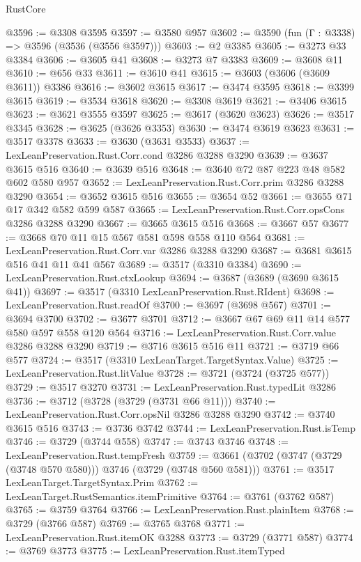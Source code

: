 \begin{lexlean}{RustCore}
\begin{coremodule}
@3596 := @3308 @3595
@3597 := @3580 @957
@3602 := @3590 (fun (Γ : @3338) => @3596 (@3536 (@3556 @3597)))
@3603 := @2 @3385
@3605 := @3273 @33 @3384
@3606 := @3605 @41
@3608 := @3273 @7 @3383
@3609 := @3608 @11
@3610 := @656 @33
@3611 := @3610 @41
@3615 := @3603 (@3606 (@3609 @3611)) @3386
@3616 := @3602 @3615
@3617 := @3474 @3595
@3618 := @3399 @3615
@3619 := @3534 @3618
@3620 := @3308 @3619
@3621 := @3406 @3615
@3623 := @3621 @3555 @3597
@3625 := @3617 (@3620 @3623)
@3626 := @3517 @3345
@3628 := @3625 (@3626 @3353)
@3630 := @3474 @3619 @3623
@3631 := @3517 @3378
@3633 := @3630 (@3631 @3533)
@3637 := LexLeanPreservation.Rust.Corr.cond @3286 @3288 @3290
@3639 := @3637 @3615 @516
@3640 := @3639 @516
@3648 := @3640 @72 @87 @223 @48 @582 @602 @580 @957
@3652 := LexLeanPreservation.Rust.Corr.prim @3286 @3288 @3290
@3654 := @3652 @3615 @516
@3655 := @3654 @52
@3661 := @3655 @71 @17 @342 @582 @599 @587
@3665 := LexLeanPreservation.Rust.Corr.opsCons @3286 @3288 @3290
@3667 := @3665 @3615 @516
@3668 := @3667 @57
@3677 := @3668 @70 @11 @15 @567 @581 @598 @558 @110 @564
@3681 := LexLeanPreservation.Rust.Corr.var @3286 @3288 @3290
@3687 := @3681 @3615 @516 @41 @11 @41 @567
@3689 := @3517 (@3310 @3384)
@3690 := LexLeanPreservation.Rust.ctxLookup
@3694 := @3687 (@3689 (@3690 @3615 @41))
@3697 := @3517 (@3310 LexLeanPreservation.Rust.RIdent)
@3698 := LexLeanPreservation.Rust.readOf
@3700 := @3697 (@3698 @567)
@3701 := @3694 @3700
@3702 := @3677 @3701
@3712 := @3667 @67 @69 @11 @14 @577 @580 @597 @558 @120 @564
@3716 := LexLeanPreservation.Rust.Corr.value @3286 @3288 @3290
@3719 := @3716 @3615 @516 @11
@3721 := @3719 @66 @577
@3724 := @3517 (@3310 LexLeanTarget.TargetSyntax.Value)
@3725 := LexLeanPreservation.Rust.litValue
@3728 := @3721 (@3724 (@3725 @577))
@3729 := @3517 @3270
@3731 := LexLeanPreservation.Rust.typedLit @3286
@3736 := @3712 (@3728 (@3729 (@3731 @66 @11)))
@3740 := LexLeanPreservation.Rust.Corr.opsNil @3286 @3288 @3290
@3742 := @3740 @3615 @516
@3743 := @3736 @3742
@3744 := LexLeanPreservation.Rust.isTemp
@3746 := @3729 (@3744 @558)
@3747 := @3743 @3746
@3748 := LexLeanPreservation.Rust.tempFresh
@3759 := @3661 (@3702 (@3747 (@3729 (@3748 @570 @580))) @3746 (@3729 (@3748 @560 @581)))
@3761 := @3517 LexLeanTarget.TargetSyntax.Prim
@3762 := LexLeanTarget.RustSemantics.itemPrimitive
@3764 := @3761 (@3762 @587)
@3765 := @3759 @3764
@3766 := LexLeanPreservation.Rust.plainItem
@3768 := @3729 (@3766 @587)
@3769 := @3765 @3768
@3771 := LexLeanPreservation.Rust.itemOK @3288
@3773 := @3729 (@3771 @587)
@3774 := @3769 @3773
@3775 := LexLeanPreservation.Rust.itemTyped

\end{coremodule}
\end{lexlean}
